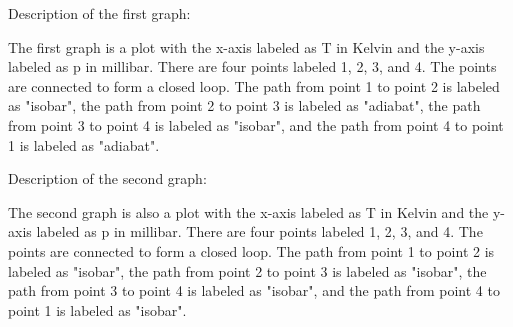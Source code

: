 Description of the first graph:

The first graph is a plot with the x-axis labeled as T in Kelvin and the y-axis labeled as p in millibar. There are four points labeled 1, 2, 3, and 4. The points are connected to form a closed loop. The path from point 1 to point 2 is labeled as "isobar", the path from point 2 to point 3 is labeled as "adiabat", the path from point 3 to point 4 is labeled as "isobar", and the path from point 4 to point 1 is labeled as "adiabat".

Description of the second graph:

The second graph is also a plot with the x-axis labeled as T in Kelvin and the y-axis labeled as p in millibar. There are four points labeled 1, 2, 3, and 4. The points are connected to form a closed loop. The path from point 1 to point 2 is labeled as "isobar", the path from point 2 to point 3 is labeled as "isobar", the path from point 3 to point 4 is labeled as "isobar", and the path from point 4 to point 1 is labeled as "isobar".